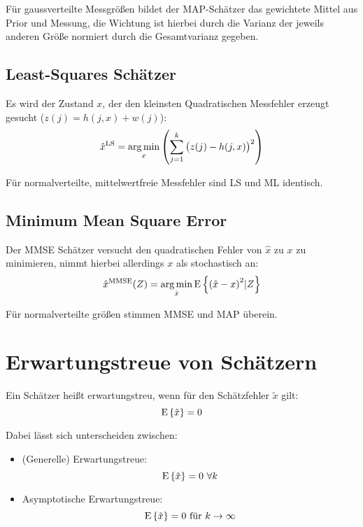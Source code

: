 Für gaussverteilte Messgrößen bildet der MAP-Schätzer das gewichtete Mittel aus Prior und Messung, die Wichtung ist hierbei durch die Varianz der jeweils anderen Größe normiert durch die Gesamtvarianz gegeben.

\subsection{Least-Squares Schätzer}
Es wird der Zustand $x$, der den kleinsten Quadratischen Messfehler erzeugt gesucht ($z(j) = h(j, x) + w(j)$):
\begin{equation*}
    \hat{x}^\text{LS} = \operatorname*{arg\,min}_x \left( \sum_{j=1}^k {\left(z(j) - h(j,x)\right)}^2 \right)
\end{equation*}

Für normalverteilte, mittelwertfreie Messfehler sind LS und ML identisch.

\subsection{Minimum Mean Square Error}
Der MMSE Schätzer versucht den quadratischen Fehler von $\hat{x}$ zu $x$ zu minimieren, nimmt hierbei allerdings $x$ als stochastisch an:
\begin{equation*}
    \hat{x}^\text{MMSE}(Z) = \operatorname*{arg\,min}_{\hat{x}} \operatorname*{E}\left\{{(\hat{x} - x)}^2 | Z\right\}
\end{equation*}

Für normalverteilte größen stimmen MMSE und MAP überein.

\section{Erwartungstreue von Schätzern}
Ein Schätzer heißt erwartungstreu, wenn für den Schätzfehler $\tilde{x}$ gilt:
\begin{equation*}
    \operatorname*{E}\left\{\tilde{x}\right\} = 0
\end{equation*}

Dabei lässt sich unterscheiden zwischen:
\begin{itemize}
    \item (Generelle) Erwartungstreue:
        \begin{equation*}
            \operatorname*{E}\left\{\tilde{x}\right\} = 0\ \forall k
        \end{equation*}
    \item Asymptotische Erwartungstreue:
        \begin{equation*}
            \operatorname*{E}\left\{\tilde{x}\right\} = 0\ \text{für } k \to \infty
        \end{equation*}
\end{itemize}

